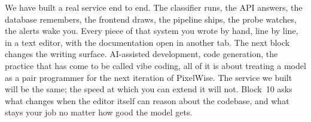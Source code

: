 

 We have built a real service end to
end. The classifier runs, the API answers, the database remembers, the
frontend draws, the pipeline ships, the probe watches, the alerts wake
you. Every piece of that system you wrote by hand, line by line, in a
text editor, with the documentation open in another tab. The next block
changes the writing surface. AI-assisted development, code generation,
the practice that has come to be called vibe coding, all of it is about
treating a model as a pair programmer for the next iteration of
PixelWise. The service we built will be the same; the speed at which
you can extend it will not. Block~10 asks what changes when the editor
itself can reason about the codebase, and what stays your job no matter
how good the model gets.

